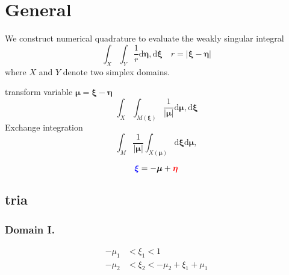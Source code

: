 \documentclass{article}
\newcommand{\td}{\mathrm{d}}
\begin{document}
\section{General}

We construct numerical quadrature to evaluate the weakly singular integral
%
\begin{equation}
\int_X
\int_Y
\frac{1}{r}
\td \bm{\eta},
\td \bm{\xi}
\quad
r = |\bm{\xi}-\bm{\eta}|
\end{equation}
%
where $X$ and $Y$ denote two simplex domains.


transform variable $\bm{\mu} = \bm{\xi}-\bm{\eta}$
%
\begin{equation}
\int_X
\int_{M(\bm{\xi})}
\frac{1}{|\bm{\mu}|}
\td \bm{\mu},
\td \bm{\xi}
\end{equation}
%
Exchange integration
%
\begin{equation}
\int_{M}
\frac{1}{|\bm{\mu}|}
\int_{X(\bm{\mu})}
\td \bm{\xi}
\td \bm{\mu},
\end{equation}



\begin{equation}
{\color{blue}\bm{\xi}} = -\bm{\mu} + {\color{red}\bm{\eta}}
\end{equation}



\subsection{tria}

\newcommand{\commontri}{
\path [draw=gray] (1,0) -- (1,1) -- (0,1) -- (-1,0) -- (-1,-1) -- (0,-1) -- cycle;
\path [draw=gray] (-1,0) -- (1,0);
\path [draw=gray] (0,-1) -- (0,1);
\path [draw=gray] (-1,-1) -- (1,1);
\path [draw, ->] (-.2,0) -- (1.2,0) node [anchor = west] {$\xi_1$};
\path [draw, ->] (0,-.2) -- (0,1.2) node [anchor = south] {$\xi_2$};
\path [fill=red, opacity=.5] (0-\m,0-\p) -- (1-\m,0-\p) -- (1-\m,1-\p) -- cycle;
\path [fill = blue, opacity=.5] (0,0) -- (1,0) -- (1,1) -- cycle;
\path [draw, fill] (\m,\p) circle(.03) -- (-\m,-\p) circle(.03);
}


\subsubsection{Domain I.}
%
%
\begin{align}
-\mu_1 &< \xi_1 < 1 \nonumber \\
-\mu_2 &< \xi_2 < -\mu_2 + \xi_1+\mu_1 \nonumber
\end{align}
\end{document}
